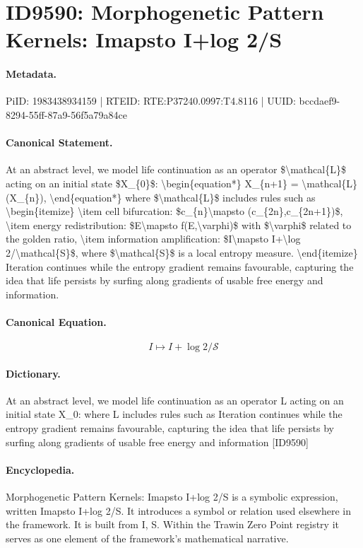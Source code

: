 \section*{ID9590: Morphogenetic Pattern Kernels: Imapsto I+log 2/S}
\paragraph{Metadata.}
PiID: 1983438934159 | RTEID: RTE:P37240.0997:T4.8116 | UUID: bccdaef9-8294-55ff-87a9-56f5a79a84ce

\paragraph{Canonical Statement.}
At an abstract level, we model life continuation as an operator \$\textbackslash{}mathcal\{L\}\$ acting on an initial state \$X\_\{0\}\$: \textbackslash{}begin\{equation*\} X\_\{n+1\} = \textbackslash{}mathcal\{L\}(X\_\{n\}), \textbackslash{}end\{equation*\} where \$\textbackslash{}mathcal\{L\}\$ includes rules such as \textbackslash{}begin\{itemize\} \textbackslash{}item cell bifurcation: \$c\_\{n\}\textbackslash{}mapsto (c\_\{2n\},c\_\{2n+1\})\$, \textbackslash{}item energy redistribution: \$E\textbackslash{}mapsto f(E,\textbackslash{}varphi)\$ with \$\textbackslash{}varphi\$ related to the golden ratio, \textbackslash{}item information amplification: \$I\textbackslash{}mapsto I+\textbackslash{}log 2/\textbackslash{}mathcal\{S\}\$, where \$\textbackslash{}mathcal\{S\}\$ is a local entropy measure. \textbackslash{}end\{itemize\} Iteration continues while the entropy gradient remains favourable, capturing the idea that life persists by surfing along gradients of usable free energy and information.

\paragraph{Canonical Equation.}
\[
I\mapsto I+\log 2/\mathcal{S}
\]

\paragraph{Dictionary.}
At an abstract level, we model life continuation as an operator L acting on an initial state X\_0: where L includes rules such as Iteration continues while the entropy gradient remains favourable, capturing the idea that life persists by surfing along gradients of usable free energy and information [ID9590]

\paragraph{Encyclopedia.}
Morphogenetic Pattern Kernels: Imapsto I+log 2/S is a symbolic expression, written Imapsto I+log 2/S. It introduces a symbol or relation used elsewhere in the framework. It is built from I, S. Within the Trawin Zero Point registry it serves as one element of the framework's mathematical narrative.
